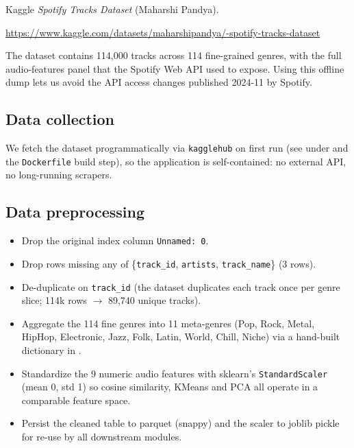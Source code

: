 \documentclass[11pt,a4paper]{article}
\begin{document}
Kaggle \emph{Spotify Tracks Dataset} (Maharshi Pandya).

\begin{sloppypar}
\noindent\url{https://www.kaggle.com/datasets/maharshipandya/-spotify-tracks-dataset}
\end{sloppypar}

The dataset contains 114{,}000 tracks across 114 fine-grained genres,
with the full audio-features panel that the Spotify Web API used to
expose. Using this offline dump lets us avoid the API access changes
published 2024-11 by Spotify.

\subsection{Data collection}

We fetch the dataset programmatically via \texttt{kagglehub} on first
run (see  under  and
the \texttt{Dockerfile} build step), so the application is
self-contained: no external API, no long-running scrapers.

\subsection{Data preprocessing}

\begin{itemize}
  \item Drop the original index column \texttt{Unnamed: 0}.
  \item Drop rows missing any of \{\texttt{track\_id}, \texttt{artists},
        \texttt{track\_name}\} (3 rows).
  \item De-duplicate on \texttt{track\_id} (the dataset duplicates each
        track once per genre slice; 114k rows $\to$ 89{,}740 unique
        tracks).
  \item Aggregate the 114 fine genres into 11 meta-genres (Pop, Rock,
        Metal, HipHop, Electronic, Jazz, Folk, Latin, World, Chill,
        Niche) via a hand-built dictionary in
        .
  \item Standardize the 9 numeric audio features with sklearn's
        \texttt{StandardScaler} (mean 0, std 1) so cosine similarity,
        KMeans and PCA all operate in a comparable feature space.
  \item Persist the cleaned table to parquet (snappy) and the scaler to
        joblib pickle for re-use by all downstream modules.
\end{itemize}
\end{document}

